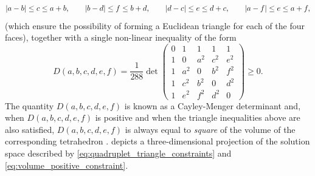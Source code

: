 \documentclass[notitlepage, 10pt]{article}
\begin{document}
\begin{exam}[Tetrahedral Horn's problem for \texorpdfstring{$d=2$}{d=2}]
    \begin{equation}
        \label{eq:quadruplet_triangle_constraints}
        \left|a-b\right| \leq c \leq a+b, \qquad
        \left|b-d\right| \leq f \leq b+d, \qquad
        \left|d-c\right| \leq e \leq d+c, \qquad
        \left|a-f\right| \leq e \leq a+f,
    \end{equation}
    (which ensure the possibility of forming a Euclidean triangle for each of the four faces),
    together with a single non-linear inequality of the form
    \begin{equation}
        \label{eq:volume_positive_constraint}
        D(a,b,c,d,e,f) = \frac{1}{288}\det 
        \begin{pmatrix}
            0 & 1 & 1 & 1 & 1 \\ 
            1 & 0 & a^2 & c^2 & e^2 \\ 
            1 & a^2 & 0 & b^2 & f^2 \\ 
            1 & c^2 & b^2 & 0 & d^2 \\ 
            1 & e^2 & f^2 & d^2 & 0
        \end{pmatrix}
        \geq 0.
    \end{equation}
    The quantity $D(a,b,c,d,e,f)$ is known as a Cayley-Menger determinant and, when $D(a,b,c,d,e,f)$ is positive and when the triangle inequalities above are also satisfied, $D(a,b,c,d,e,f)$ is always equal to \textit{square} of the volume of the corresponding tetrahedron \cite[Equation 5.2]{sitharam2018handbook}\footnotemark{}.
     depicts a three-dimensional projection of the solution space described by \cref{eq:quadruplet_triangle_constraints} and \cref{eq:volume_positive_constraint}.


\end{exam}
\end{document}
